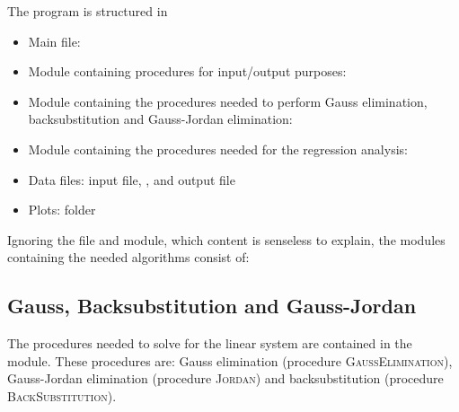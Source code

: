 The program is structured in
\begin{itemize}
    \item Main file: 
        \item Module containing procedures for input/output purposes: 
        \item Module containing the procedures needed to perform Gauss elimination,
            backsubstitution and Gauss-Jordan elimination: 
        \item Module containing the procedures needed for the regression analysis: 
        \item Data files: input file, , and output file
        \item Plots:  folder
\end{itemize}

Ignoring the  file and  module, which content is
senseless to explain, the modules containing the needed algorithms consist of:

\subsection{Gauss, Backsubstitution and Gauss-Jordan}
The procedures needed to solve for the linear system are contained in the 
 module. These procedures are: Gauss elimination
(procedure \textsc{GaussElimination}), Gauss-Jordan elimination 
(procedure \textsc{Jordan}) and backsubstitution (procedure \textsc{BackSubstitution}).

